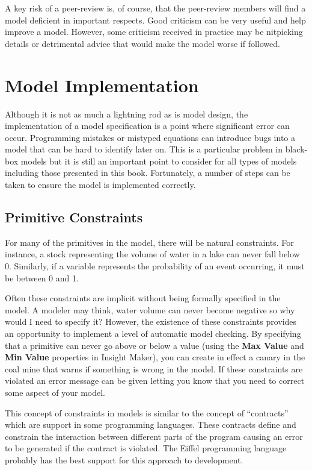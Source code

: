 \documentclass[]{memoir}
\renewcommand{\a}[1]{\textbf{#1}}
\begin{document}
A key risk of a peer-review is, of course, that the peer-review members
will find a model deficient in important respects. Good criticism can be
very useful and help improve a model. However, some criticism received
in practice may be nitpicking details or detrimental advice that would
make the model worse if followed.

\section{Model Implementation}

Although it is not as much a lightning rod as is model design, the
implementation of a model specification is a point where significant
error can occur. Programming mistakes or mistyped equations can
introduce bugs into a model that can be hard to identify later on. This
is a particular problem in black-box models but it is still an important
point to consider for all types of models including those presented in
this book. Fortunately, a number of steps can be taken to ensure the
model is implemented correctly.

\subsection{Primitive Constraints}

For many of the primitives in the model, there will be natural
constraints. For instance, a stock representing the volume of water in a
lake can never fall below 0. Similarly, if a variable represents the
probability of an event occurring, it must be between 0 and 1.

Often these constraints are implicit without being formally specified in
the model. A modeler may think, water volume can never become negative
so why would I need to specify it? However, the existence of these
constraints provides an opportunity to implement a level of automatic
model checking. By specifying that a primitive can never go above or
below a value (using the \a{Max Value} and \a{Min Value} properties in
Insight Maker), you can create in effect a canary in the coal mine that
warns if something is wrong in the model. If these constraints are
violated an error message can be given letting you know that you need to
correct some aspect of your model.

This concept of constraints in models is similar to the concept of
``contracts'' which are support in some programming languages. These
contracts define and constrain the interaction between different parts
of the program causing an error to be generated if the contract is
violated. The Eiffel programming language probably has the best support
for this approach to development.
\end{document}
